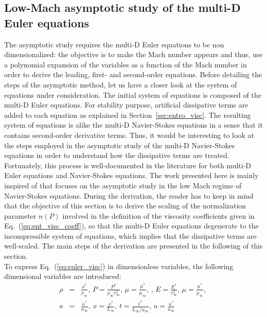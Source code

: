 \documentclass[preprint,10pt]{elsarticle}
\newcommand{\eqt}[1]{Eq.~(\ref{#1})}                     %
\newcommand{\sct}[1]{Section~\ref{#1}}                   %
\begin{document}
\subsection{Low-Mach asymptotic study of the multi-D Euler equations} \label{sec:lowMach}
The asymptotic study requires the multi-D Euler equations to be non dimensionalized: the objective is to make the Mach number appears and thus, use a polynomial expansion of the variables as a function of the Mach number in order to derive the leading, first- and second-order equations. Before detailing the steps of the asymptotic method, let us have a closer look at the system of equations under consideration. The initial system of equations is composed of the multi-D Euler equations. For stability purpose, artificial dissipative terms are added to each equation as explained in \sct{sec:entro_visc}. The resulting system of equations is alike the multi-D Navier-Stokes equations in a sense that it contains second-order derivative terms. Thus, it would be interesting to look at the steps employed in the asymptotic study of the multi-D Navier-Stokes equations in order to understand how the dissipative terms are treated. Fortunately, this process is well-documented in the literature \cite{LowMach1, LowMach2, LowMach3} for both multi-D Euler equations and Navier-Stokes equations. The work presented here is mainly inspired of \cite{Muller} that focuses on the asymptotic study in the low Mach regime of Navier-Stokes equations. During the derivation, the reader has to keep in mind that the objective of this section is to derive the scaling of the normalization parameter $n(P)$ involved in the definition of the viscosity coefficients given in \eqt{eq:ent_visc_coeff}, so that the multi-D Euler equations degenerate to the incompressible system of equations, which implies that the dissipative terms are well-scaled. The main steps of the derivation are presented in the following of this section.\\
To express \eqt{eq:euler_visc} in dimensionless variables, the following dimensional variables are introduced:
\begin{eqnarray}
\label{eq:norm_param}
\rho &=& \frac{\rho^*}{\rho_{\infty}} \text{, } P = \frac{P^*}{\rho_{\infty}c^2_{\infty}} \text{, } \mu = \frac{\mu^*}{\mu_{\infty}} \text{, } \text{, }  E = \frac{E^*}{c^2_{\infty} } \text{, } 
\mu = \frac{\mu^*}{\mu_{\infty}} \text{, }\nonumber \\
 \kappa &=& \frac{\kappa^*}{\kappa_{\infty}} \text{, }
x = \frac{x^*}{L_{\infty}} \text{, } t = \frac{t^*}{L_{\infty} / u_{\infty}} \text{, } u = \frac{u^*}{u_{\infty}}
\end{eqnarray}
\end{document}

